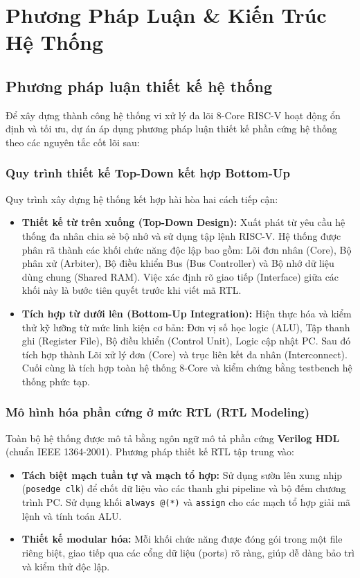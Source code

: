 \chapter{Phương Pháp Luận \& Kiến Trúc Hệ Thống}

\section{Phương pháp luận thiết kế hệ thống}
Để xây dựng thành công hệ thống vi xử lý đa lõi 8-Core RISC-V hoạt động ổn định và tối ưu, dự án áp dụng phương pháp luận thiết kế phần cứng hệ thống theo các nguyên tắc cốt lõi sau:

\subsection{Quy trình thiết kế Top-Down kết hợp Bottom-Up}
Quy trình xây dựng hệ thống kết hợp hài hòa hai cách tiếp cận:
\begin{itemize}
    \item \textbf{Thiết kế từ trên xuống (Top-Down Design):} Xuất phát từ yêu cầu hệ thống đa nhân chia sẻ bộ nhớ và sử dụng tập lệnh RISC-V. Hệ thống được phân rã thành các khối chức năng độc lập bao gồm: Lõi đơn nhân (Core), Bộ phân xử (Arbiter), Bộ điều khiển Bus (Bus Controller) và Bộ nhớ dữ liệu dùng chung (Shared RAM). Việc xác định rõ giao tiếp (Interface) giữa các khối này là bước tiên quyết trước khi viết mã RTL.
    \item \textbf{Tích hợp từ dưới lên (Bottom-Up Integration):} Hiện thực hóa và kiểm thử kỹ lưỡng từ mức linh kiện cơ bản: Đơn vị số học logic (ALU), Tập thanh ghi (Register File), Bộ điều khiển (Control Unit), Logic cập nhật PC. Sau đó tích hợp thành Lõi xử lý đơn (Core) và trục liên kết đa nhân (Interconnect). Cuối cùng là tích hợp toàn hệ thống 8-Core và kiểm chứng bằng testbench hệ thống phức tạp.
\end{itemize}

\subsection{Mô hình hóa phần cứng ở mức RTL (RTL Modeling)}
Toàn bộ hệ thống được mô tả bằng ngôn ngữ mô tả phần cứng \textbf{Verilog HDL} (chuẩn IEEE 1364-2001). Phương pháp thiết kế RTL tập trung vào:
\begin{itemize}
    \item \textbf{Tách biệt mạch tuần tự và mạch tổ hợp:} Sử dụng sườn lên xung nhịp (\texttt{posedge clk}) để chốt dữ liệu vào các thanh ghi pipeline và bộ đếm chương trình PC. Sử dụng khối \texttt{always @(*)} và \texttt{assign} cho các mạch tổ hợp giải mã lệnh và tính toán ALU.
    \item \textbf{Thiết kế modular hóa:} Mỗi khối chức năng được đóng gói trong một file riêng biệt, giao tiếp qua các cổng dữ liệu (ports) rõ ràng, giúp dễ dàng bảo trì và kiểm thử độc lập.
\end{itemize}

